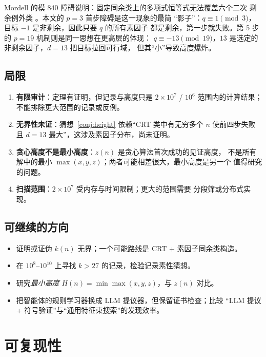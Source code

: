 \documentclass[11pt,a4paper]{ctexart}
\theoremstyle{definition}
\theoremstyle{remark}
\begin{document}
Mordell 的模 $840$ 障碍说明：固定同余类上的多项式恒等式无法覆盖六个二次
剩余例外类 \cite{mordell1967}。本文的 $p=3$ 首步障碍是这一现象的最简
“影子”：$q\equiv1\pmod3$，目标 $-1$ 是非剩余，因此只要 $q$ 的所有素因子
都是剩余，第一步就失败。第 5 步的 $p=19$ 机制则是同一思想在更高层的体现：
$q\equiv-13\pmod{19}$，$13$ 是选定的非剩余因子，$d=13$ 把目标拉回可行域，
但其“小”导致高度爆炸。

\subsection{局限}

\begin{enumerate}
\item \textbf{有限审计}：定理有证明，但记录与高度只是 $2\times10^7$ /
$10^6$ 范围内的计算结果；不能排除更大范围的记录或反例。
\item \textbf{无界性未证}：猜想~\ref{conj:height} 依赖“CRT 类中有无穷多个
$n$ 使前四步失败且 $d=13$ 最大”，这涉及素因子分布，尚未证明。
\item \textbf{贪心高度不是最小高度}：$z(n)$ 是贪心算法首次成功的见证高度，
不是所有解中的最小 $\max(x,y,z)$；两者可能相差很大，最小高度是另一个
值得研究的问题。
\item \textbf{扫描范围}：$2\times10^7$ 受内存与时间限制；更大的范围需要
分段筛或分布式实现。
\end{enumerate}

\subsection{可继续的方向}

\begin{itemize}
\item 证明或证伪 $k(n)$ 无界；一个可能路线是 CRT + 素因子同余类构造。
\item 在 $10^8$--$10^{10}$ 上寻找 $k>27$ 的记录，检验记录素性猜想。
\item 研究\emph{最小高度} $H(n)=\min\max(x,y,z)$，与 $z(n)$ 对比。
\item 把智能体的规则学习器换成 LLM 提议器，但保留证书检查；比较
“LLM 提议 + 符号验证”与“通用特征束搜索”的发现效率。
\end{itemize}

\section{可复现性}
\end{document}
